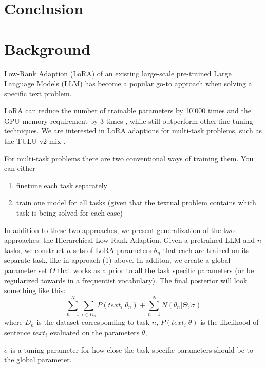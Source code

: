 \documentclass{article}
\begin{document}


\section{Conclusion}

\section*{Background}
Low-Rank  Adaption (LoRA) of an existing large-scale pre-trained Large Language Models (LLM) \cite{hu_lora_2021} has become a popular go-to approach when solving a specific text problem.

LoRA can reduce the number of trainable parameters by 10'000 times and the GPU memory requirement by 3 times \cite{hu_lora_2021}, while still outperform other fine-tuning techniques.
We are interested in LoRA adaptions for multi-task problems, such as the TULU-v2-mix \cite{ivison_camels_2023}.

For multi-task problems there are two conventional ways of training them. You can either 
\begin{enumerate}
    \item finetune each task separately
    \item train one model for all tasks (given that the textual problem contains which task is being solved for each case)
\end{enumerate}

In addition to these two approaches, we present generalization of the two approaches: the Hierarchical Low-Rank Adaption.
Given a pretrained LLM and $n$ tasks, we construct $n$ sets of LoRA parameters $\theta_n$ that each are trained on its separate task, like in approach (1) above. In additon, we create a global parameter set $\Theta$ that works as a prior to all the task specific parameters (or be regularized towards in a frequentist vocabulary).
The final posterior will look something like this:
%
\begin{equation} \label{eq:posterior}
    \sum_{n=1}^N  \sum_{i \in D_n} P(text_i | \theta_n) + \sum_{n=1}^N N(\theta_n | \Theta, \sigma)
\end{equation}
%
where
$D_n$ is the dataset corresponding to task $n$,
$P(text_i | \theta)$ is the likelihood of sentence $text_i$ evaluated on the parameters $\theta$,

$\sigma$ is a tuning parameter for how close the task specific parameters should be to the global parameter.
\end{document}
